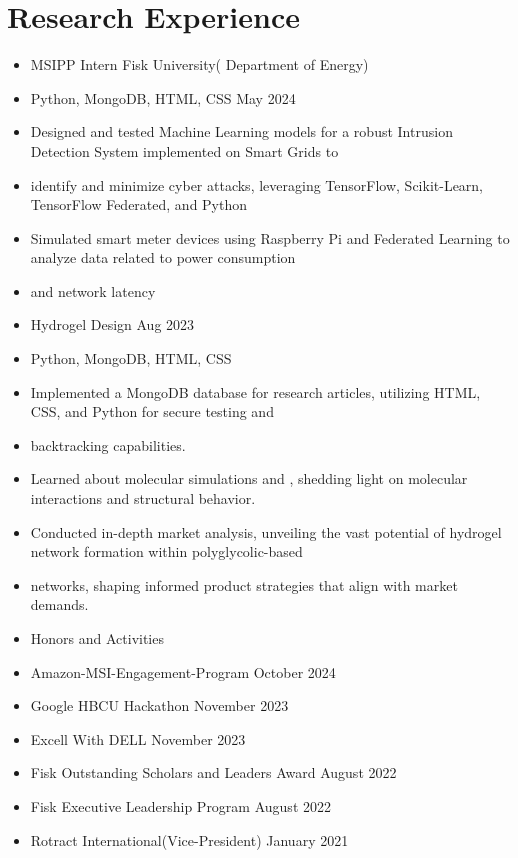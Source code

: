 \documentclass[letterpaper,10pt]{article}
\begin{document}
\section{Research Experience}
\begin{itemize}
  \item MSIPP Intern Fisk University( Department of Energy)
  \item Python, MongoDB, HTML, CSS May 2024
  \item Designed and tested Machine Learning models for a robust Intrusion Detection System implemented on Smart Grids to
  \item identify and minimize cyber attacks, leveraging TensorFlow, Scikit-Learn, TensorFlow Federated, and Python
  \item Simulated smart meter devices using Raspberry Pi and Federated Learning to analyze data related to power consumption
  \item and network latency
  \item Hydrogel Design Aug 2023
  \item Python, MongoDB, HTML, CSS
  \item Implemented a MongoDB database for research articles, utilizing HTML, CSS, and Python for secure testing and
  \item backtracking capabilities.
  \item Learned about molecular simulations and , shedding light on molecular interactions and structural behavior.
  \item Conducted in-depth market analysis, unveiling the vast potential of hydrogel network formation within polyglycolic-based
  \item networks, shaping informed product strategies that align with market demands.
  \item Honors and Activities
  \item Amazon-MSI-Engagement-Program October 2024
  \item Google HBCU Hackathon November 2023
  \item Excell With DELL November 2023
  \item Fisk Outstanding Scholars and Leaders Award August 2022
  \item Fisk Executive Leadership Program August 2022
  \item Rotract International(Vice-President) January 2021
\end{itemize}
\end{document}

